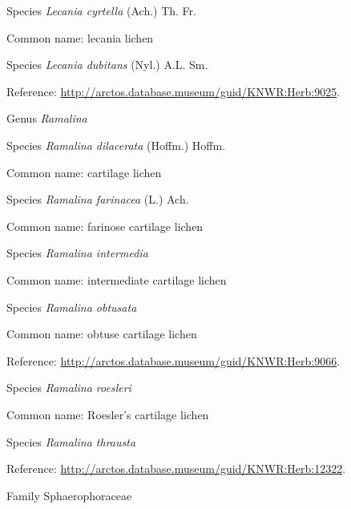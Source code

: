 \documentclass[9pt, article]{memoir}
\begin{document}
\begin{multicols}{2}
\vspace{6pt}\noindent\hspace{36pt}Species \textit{Lecania cyrtella} (Ach.) Th. Fr.


Common name: lecania lichen

\vspace{6pt}\noindent\hspace{36pt}Species \textit{Lecania dubitans} (Nyl.) A.L. Sm.


Reference: 
\url{http://arctos.database.museum/guid/KNWR:Herb:9025}.

\vspace{6pt}\noindent\hspace{30pt}Genus \textit{Ramalina}


\vspace{6pt}\noindent\hspace{36pt}Species \textit{Ramalina dilacerata} (Hoffm.) Hoffm.


Common name: cartilage lichen

\vspace{6pt}\noindent\hspace{36pt}Species \textit{Ramalina farinacea} (L.) Ach.


Common name: farinose cartilage lichen

\vspace{6pt}\noindent\hspace{36pt}Species \textit{Ramalina intermedia}


Common name: intermediate cartilage lichen

\vspace{6pt}\noindent\hspace{36pt}Species \textit{Ramalina obtusata}


Common name: obtuse cartilage lichen

Reference: 
\url{http://arctos.database.museum/guid/KNWR:Herb:9066}.

\vspace{6pt}\noindent\hspace{36pt}Species \textit{Ramalina roesleri}


Common name: Roesler's cartilage lichen

\vspace{6pt}\noindent\hspace{36pt}Species \textit{Ramalina thrausta}


Reference: 
\url{http://arctos.database.museum/guid/KNWR:Herb:12322}.

\vspace{6pt}\noindent\hspace{24pt}Family Sphaerophoraceae



\end{multicols}
\end{document}

